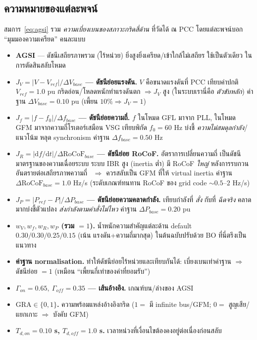 \documentclass[12pt,a4paper]{article}
\begin{document}
\subsection{ความหมายของแต่ละพจน์}
\label{sec:meaning}
สมการ~\eqref{eq:agsi} รวม \emph{ความเบี่ยงเบนของสภาวะกริดสี่ด้าน} ที่วัดได้ ณ PCC โดยแต่ละพจน์บอก
``มุมมองความเครียด'' คนละแบบ

\begin{itemize}
\item \textbf{AGSI} --- ดัชนีเสถียรภาพรวม (ไร้หน่วย) ยิ่งสูงยิ่งเครียด/เข้าใกล้ไม่เสถียร ใช้เป็นตัวเดียว
ในการตัดสินสลับโหมด

\item \textbf{$J_V=\lvert V-V_{ref}\rvert/\Delta V_{base}$ --- ดัชนีย่อยแรงดัน.} $V$ คือขนาดแรงดันที่ PCC
เทียบค่าปกติ $V_{ref}=1.0$ pu กริดอ่อน/โหลดหนักทำแรงดันตก $\Rightarrow J_V$ สูง (ในระบบเรานี่คือ
\emph{ตัวขับหลัก}) ค่าฐาน $\Delta V_{base}=0.10$ pu (เพี้ยน $10\%\Rightarrow J_V=1$)

\item \textbf{$J_f=\lvert f-f_0\rvert/\Delta f_{base}$ --- ดัชนีย่อยความถี่.} $f$ ในโหมด GFL มาจาก PLL,
ในโหมด GFM มาจากความถี่โรเตอร์เสมือน VSG เทียบพิกัด $f_0=60$ Hz บ่งชี้ \emph{ความไม่สมดุลกำลัง}/แนวโน้ม
หลุด synchronism ค่าฐาน $\Delta f_{base}=0.50$ Hz

\item \textbf{$J_R=\lvert \mathrm{d}f/\mathrm{d}t\rvert/\Delta \mathrm{RoCoF}_{base}$ --- ดัชนีย่อย RoCoF.}
อัตราการเปลี่ยนความถี่ เป็นดัชนีมาตรฐานของความเฉื่อยระบบ ระบบ IBR สูง (inertia ต่ำ) มี RoCoF \emph{ใหญ่}
หลังการรบกวน อันตรายต่อเสถียรภาพความถี่~\cite{entsoe_rocof} $\Rightarrow$ ควรสลับเป็น GFM ที่ให้ virtual
inertia ค่าฐาน $\Delta \mathrm{RoCoF}_{base}=1.0$ Hz/s (ระดับเกณฑ์ทนทาน RoCoF ของ grid code $\sim0.5$--$2$ Hz/s)

\item \textbf{$J_P=\lvert P_{ref}-P\rvert/\Delta P_{base}$ --- ดัชนีย่อยความคลาดกำลัง.} เทียบกำลังที่ \emph{สั่ง}
กับที่ \emph{ฉีดจริง} คลาดมากบ่งชี้ตัวแปลง \emph{ส่งกำลังตามคำสั่งไม่ไหว} ค่าฐาน $\Delta P_{base}=0.20$ pu

\item \textbf{$w_V,w_f,w_R,w_P$ (รวม $=1$).} น้ำหนักความสำคัญแต่ละด้าน default $0.30/0.30/0.25/0.15$ (เน้น
แรงดัน+ความถี่มากสุด) ในต้นฉบับปรับด้วย BO ที่นี่ตรึงเป็นแนวทาง

\item \textbf{ค่าฐาน normalisation.} ทำให้ดัชนีย่อยไร้หน่วยและเทียบกันได้: เบี่ยงเบนเท่าค่าฐาน $\Rightarrow$
ดัชนีย่อย $=1$ (เหมือน ``เพี้ยนกี่เท่าของค่าที่ยอมรับ'')

\item \textbf{$\Gamma_{on}=0.65,\ \Gamma_{off}=0.35$ --- เส้นอ้างอิง.} เกณฑ์บน/ล่างของ AGSI

\item \textbf{$\mathrm{GRA}\in\{0,1\}$.} ความพร้อมแหล่งอ้างอิงกริด ($1=$ มี infinite bus/GFM; $0=$ สูญเสีย/
แยกเกาะ $\Rightarrow$ บังคับ GFM)

\item \textbf{$T_{d,on}=0.10$ s, $T_{d,off}=1.0$ s.} เวลาหน่วงที่เงื่อนไขต้องคงอยู่ต่อเนื่องก่อนสลับ
\end{itemize}
\end{document}
